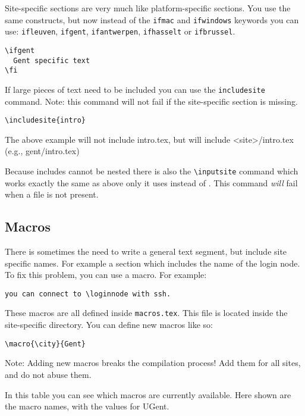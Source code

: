 \documentclass[11pt,a4paper]{article}
\begin{document}
Site-specific sections are very much like platform-specific sections. You use
the same constructs, but now instead of the \texttt{ifmac} and \texttt{ifwindows}
keywords you can use: \texttt{ifleuven}, \texttt{ifgent}, \texttt{ifantwerpen},
\texttt{ifhasselt} or \texttt{ifbrussel}.

\begin{verbatim}
\ifgent
  Gent specific text
\fi
\end{verbatim}

If large pieces of text need to be included you can use the
\lstinline|includesite| command.
Note: this command will not fail if the site-specific section is missing.

\begin{verbatim}
\includesite{intro}
\end{verbatim}

The above example will not include intro.tex, but will include <site>/intro.tex (e.g., gent/intro.tex)

Because includes cannot be nested there is also the \verb|\inputsite| command
which works exactly the same as above only it uses \verb|| instead of
\verb||. This command \emph{will} fail when a file is not present.

\subsection{Macros}
\label{sec:macros}

There is sometimes the need to write a general text segment, but include site
specific names. For example a section which includes the name of the login node.
To fix this problem, you can use a macro. For example:

\begin{verbatim}
you can connect to \loginnode with ssh.
\end{verbatim}

These macros are all defined inside \lstinline|macros.tex|. This file is located
inside the site-specific directory. You can define new macros like so:
\begin{verbatim}
\macro{\city}{Gent}
\end{verbatim}

Note: Adding new macros breaks the compilation process! Add them for all sites,
and do not abuse them.



In this table you can see which macros are currently available. Here shown are
the macro names, with the values for UGent.
\end{document}
